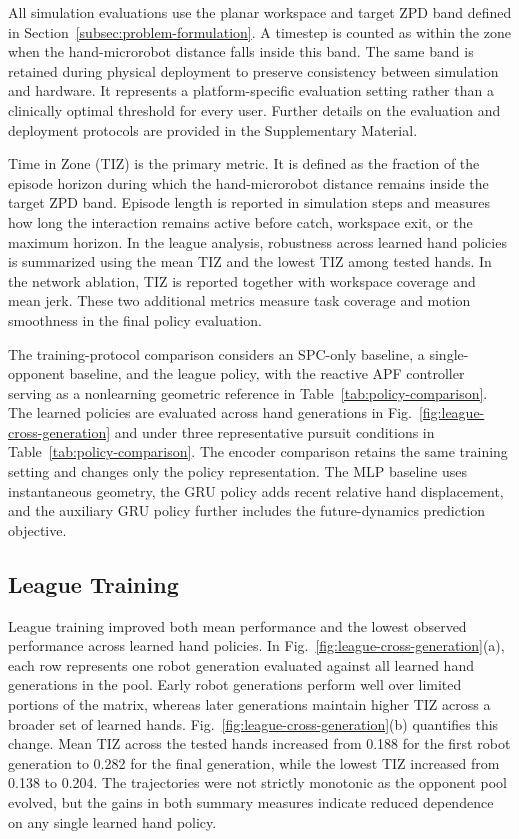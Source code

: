 \documentclass[journal,twoside,web]{ieeecolor2}
\begin{document}
All simulation evaluations use the planar workspace and target ZPD band defined in Section~\ref{subsec:problem-formulation}. A timestep is counted as within the zone when the hand-microrobot distance falls inside this band. The same band is retained during physical deployment to preserve consistency between simulation and hardware. It represents a platform-specific evaluation setting rather than a clinically optimal threshold for every user. Further details on the evaluation and deployment protocols are provided in the Supplementary Material.

Time in Zone (TIZ) is the primary metric. It is defined as the fraction of the episode horizon during which the hand-microrobot distance remains inside the target ZPD band. Episode length is reported in simulation steps and measures how long the interaction remains active before catch, workspace exit, or the maximum horizon. In the league analysis, robustness across learned hand policies is summarized using the mean TIZ and the lowest TIZ among tested hands. In the network ablation, TIZ is reported together with workspace coverage and mean jerk. These two additional metrics measure task coverage and motion smoothness in the final policy evaluation.

The training-protocol comparison considers an SPC-only baseline, a single-opponent baseline, and the league policy, with the reactive APF controller serving as a nonlearning geometric reference in Table~\ref{tab:policy-comparison}. The learned policies are evaluated across hand generations in Fig.~\ref{fig:league-cross-generation} and under three representative pursuit conditions in Table~\ref{tab:policy-comparison}. The encoder comparison retains the same training setting and changes only the policy representation. The MLP baseline uses instantaneous geometry, the GRU policy adds recent relative hand displacement, and the auxiliary GRU policy further includes the future-dynamics prediction objective.

\subsection{League Training}
\label{subsec:league-robustness}
League training improved both mean performance and the lowest observed performance across learned hand policies. In Fig.~\ref{fig:league-cross-generation}(a), each row represents one robot generation evaluated against all learned hand generations in the pool. Early robot generations perform well over limited portions of the matrix, whereas later generations maintain higher TIZ across a broader set of learned hands. Fig.~\ref{fig:league-cross-generation}(b) quantifies this change. Mean TIZ across the tested hands increased from 0.188 for the first robot generation to 0.282 for the final generation, while the lowest TIZ increased from 0.138 to 0.204. The trajectories were not strictly monotonic as the opponent pool evolved, but the gains in both summary measures indicate reduced dependence on any single learned hand policy.
\end{document}
